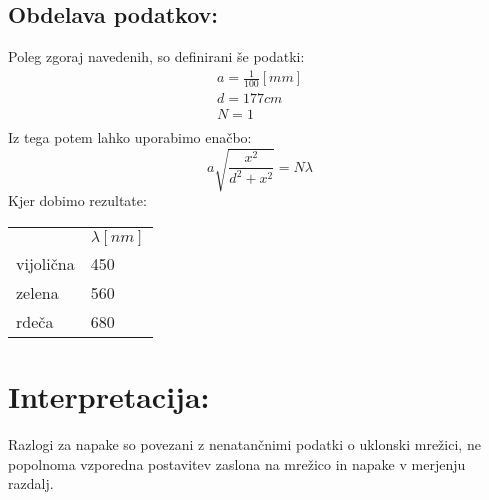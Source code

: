 \documentclass[a4paper]{article}
\begin{document}
\subsection*{Obdelava podatkov:}
Poleg zgoraj navedenih, so definirani še podatki:
\begin{gather}
   a = \frac{1}{100}[mm] \\
   d = 177cm \\
   N = 1 \\
\end{gather}
Iz tega potem lahko uporabimo enačbo:
\begin{equation}
   a\sqrt{\frac{x^2}{d^2 + x^2}} = N\lambda
\end{equation}
Kjer dobimo rezultate:
\begin{table}[H]
   \centering
\begin{tabular}{ll}
   & $\lambda[nm]$  \\
vijolična & 450\\
zelena & 560\\
rdeča & 680\\
\end{tabular}
\end{table}
\section*{Interpretacija:}

Razlogi za napake so povezani z nenatančnimi podatki o uklonski mrežici, ne popolnoma vzporedna postavitev zaslona na mrežico in napake v merjenju razdalj. 
\end{document}
